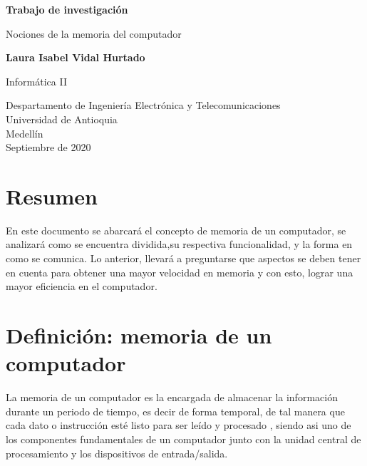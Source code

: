 \documentclass{article}
\begin{document}
\begin{titlepage}
    \begin{center}
        \vspace*{1cm}
            
        \Huge
        \textbf{Trabajo de investigación}
            
        \vspace{0.5cm}
        \LARGE
        Nociones de la memoria del computador
            
        \vspace{1.5cm}
            
        \textbf{Laura Isabel Vidal Hurtado}
        
        \vspace{1.5cm}
        \LARGE
        Informática II    
        \vfill
         
        \vspace{0.8cm}
            
        \Large
        Despartamento de Ingeniería Electrónica y Telecomunicaciones\\
        Universidad de Antioquia\\
        Medellín\\
        Septiembre de 2020
            
    \end{center}
\end{titlepage}

\tableofcontents

\section{Resumen}

En este documento se abarcará el concepto de memoria de un computador, se analizará como se encuentra dividida,su respectiva funcionalidad, y la forma en como se comunica. Lo anterior, llevará a preguntarse que aspectos se deben tener en cuenta para obtener una mayor velocidad en memoria y con esto, lograr una mayor eficiencia en el computador.


\section{Definición: memoria de un computador}

La memoria de un computador es la encargada de almacenar la información durante un periodo de tiempo, es decir de forma temporal, de tal manera que cada dato o instrucción esté listo para ser leído y procesado , siendo asi uno de los componentes fundamentales de un computador junto con la unidad central de procesamiento y los dispositivos de entrada/salida.
\end{document}
